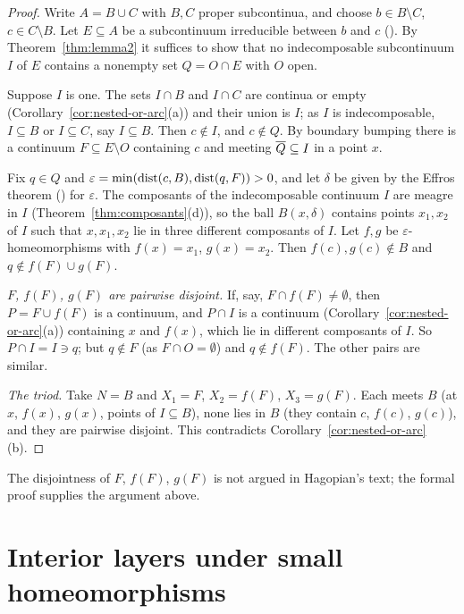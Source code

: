 \begin{proof}
Write $A=B\cup C$ with $B,C$ proper subcontinua, and choose $b\in B\setminus C$, $c\in C\setminus B$. Let $E\subseteq A$ be a
subcontinuum irreducible between $b$ and $c$ (). By Theorem~\ref{thm:lemma2} it suffices to
show that no indecomposable subcontinuum $I$ of $E$ contains a nonempty set $Q=O\cap E$ with $O$ open.

Suppose $I$ is one. The sets $I\cap B$ and $I\cap C$ are continua or empty (Corollary~\ref{cor:nested-or-arc}(a)) and
their union is $I$; as $I$ is indecomposable, $I\subseteq B$ or $I\subseteq C$, say $I\subseteq B$. Then $c\notin I$, and $c\notin Q$.
By boundary bumping there is a continuum $F\subseteq E\setminus O$ containing $c$ and meeting $\overline{Q}\subseteq I$ in a point
$x$.

Fix $q\in Q$ and $\varepsilon=\min(\operatorname{dist}(c,B),\operatorname{dist}(q,F))>0$, and let $\delta$ be given by the Effros theorem
() for $\varepsilon$. The composants of the indecomposable continuum $I$ are meagre in $I$
(Theorem~\ref{thm:composants}(d)), so the ball $B(x,\delta)$ contains points $x_1,x_2$ of $I$ such that $x,x_1,x_2$ lie
in three different composants of $I$. Let $f,g$ be $\varepsilon$-homeomorphisms with $f(x)=x_1$, $g(x)=x_2$. Then
$f(c),g(c)\notin B$ and $q\notin f(F)\cup g(F)$.

\emph{$F$, $f(F)$, $g(F)$ are pairwise disjoint.} If, say, $F\cap f(F)\ne\emptyset$, then $P=F\cup f(F)$ is a continuum,
and $P\cap I$ is a continuum (Corollary~\ref{cor:nested-or-arc}(a)) containing $x$ and $f(x)$, which lie in different
composants of $I$. So $P\cap I=I\ni q$; but $q\notin F$ (as $F\cap O=\emptyset$) and $q\notin f(F)$. The other pairs are
similar.

\emph{The triod.} Take $N=B$ and $X_1=F$, $X_2=f(F)$, $X_3=g(F)$. Each meets $B$ (at $x$, $f(x)$, $g(x)$, points of $I\subseteq
B$), none lies in $B$ (they contain $c$, $f(c)$, $g(c)$), and they are pairwise disjoint. This contradicts
Corollary~\ref{cor:nested-or-arc}(b).
\end{proof}


The disjointness of $F$, $f(F)$, $g(F)$ is not argued in Hagopian's text; the formal proof supplies the argument
above.

\section{Interior layers under small homeomorphisms}

